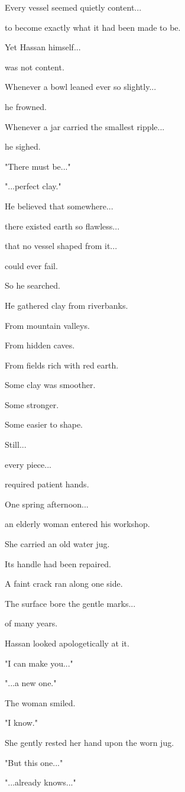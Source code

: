 \documentclass[12pt,openany]{book}
\begin{document}
Every vessel seemed quietly content...

to become exactly what it had been made to be.

Yet Hassan himself...

was not content.

Whenever a bowl leaned ever so slightly...

he frowned.

Whenever a jar carried the smallest ripple...

he sighed.

"There must be..."

"...perfect clay."

He believed that somewhere...

there existed earth so flawless...

that no vessel shaped from it...

could ever fail.

So he searched.

He gathered clay from riverbanks.

From mountain valleys.

From hidden caves.

From fields rich with red earth.

Some clay was smoother.

Some stronger.

Some easier to shape.

Still...

every piece...

required patient hands.

One spring afternoon...

an elderly woman entered his workshop.

She carried an old water jug.

Its handle had been repaired.

A faint crack ran along one side.

The surface bore the gentle marks...

of many years.

Hassan looked apologetically at it.

"I can make you..."

"...a new one."

The woman smiled.

"I know."

She gently rested her hand upon the worn jug.

"But this one..."

"...already knows..."
\end{document}
